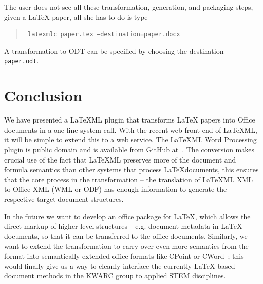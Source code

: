 \documentclass{llncs}
\def\latexml{{\LaTeX}ML\xspace}
\begin{document}
The user does not see all these transformation, generation, and packaging steps, given a
{\LaTeX} paper, all she has to do is type 
\begin{quote}\tt
latexmlc paper.tex --destination=paper.docx
\end{quote}
A transformation to ODT can be specified by choosing the destination \texttt{paper.odt}.

\section{Conclusion}\label{sec:concl}
We have presented a \latexml plugin that transforms {\LaTeX} papers into Office documents
in a one-line system call. With the recent web front-end of \latexml, it will be simple to
extend this to a web service. The \latexml Word Processing plugin is public domain and is
available from GitHub at~\cite{LaTeX2Office:github:on}. The conversion makes crucial use
of the fact that \latexml preserves more of the document and formula semantics than other
systems that process \LaTeX documents, this ensures that the core process in the
transformation -- the translation of \latexml XML to Office XML (WML or ODF) has enough
information to generate the respective target document structures.

In the future we want to develop an office package for \LaTeX, which allows the direct
markup of higher-level structures -- e.g. document metadata in {\LaTeX} documents, so that
it can be transferred to the office documents. Similarly, we want to extend the
transformation to carry over even more semantics from the \stex format into semantically
extended office formats like CPoint or
CWord~\cite{Kohlhase:SemanticInteractionDesignDiss:biblatex}; this would finally give us a
way to cleanly interface the currently {\LaTeX}-based document methods in the KWARC group
to applied STEM disciplines.

\printbibliography
\end{document}
